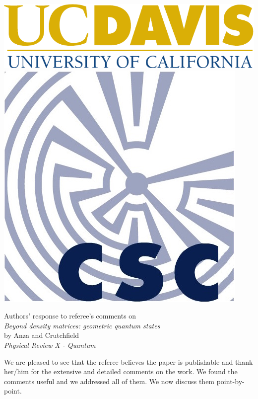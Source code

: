 \documentclass{article}
\begin{document}
\includegraphics[height=3\baselineskip]{expanded_logo_cmyk_gold-blue}
\hspace{3.7in}
\includegraphics[height=5\baselineskip]{Logo_CSC}

\hrulefill

\begin{center}
Authors' response to referee's comments on\\
\vspace{0.1in}
\emph{Beyond density matrices: geometric quantum states}\\
by Anza  and Crutchfield\\
\vspace{0.1in}
\emph{Physical Review X - Quantum} \\
\end{center}

We are pleased to see that the referee believes the paper is publishable and 
thank her/him for the extensive and detailed comments on the work. We found the
comments useful and we addressed all of them. We now discuss them point-by-point.
\end{document}
